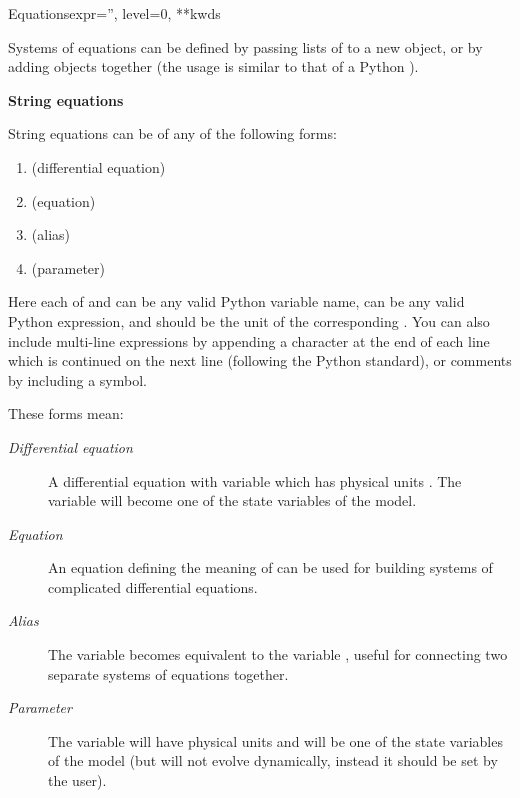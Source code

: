 \documentclass[letterpaper,10pt,english]{manual}
\begin{document}
\begin{classdesc}{Equations}{expr='', level=0, **kwds}
\begin{description}
\end{description}

Systems of equations can be defined by passing lists of \hyperlink{brian.Equations}{} to a
new \hyperlink{brian.Equations}{} object, or by adding \hyperlink{brian.Equations}{} objects together (the usage
is similar to that of a Python ).

\textbf{String equations}

String equations can be of any of the following forms:
\begin{enumerate}
\item {} 
 (differential equation)

\item {} 
 (equation)

\item {} 
 (alias)

\item {} 
 (parameter)

\end{enumerate}

Here each of  and  can be any valid Python variable name,
 can be any valid Python expression, and  should be the
unit of the corresponding . You can also include multi-line
expressions by appending a \code{\textbackslash{}} character at the end of each line
which is continued on the next line (following the Python standard),
or comments by including a \code{\#} symbol.

These forms mean:
\begin{description}
\item[\emph{Differential equation}]
A differential equation with variable  which has physical
units . The variable  will become one of the state
variables of the model.

\item[\emph{Equation}]
An equation defining the meaning of  can be used for building
systems of complicated differential equations.

\item[\emph{Alias}]
The variable  becomes equivalent to the variable , useful
for connecting two separate systems of equations together.

\item[\emph{Parameter}]
The variable  will have physical units  and will be
one of the state variables of the model (but will not evolve
dynamically, instead it should be set by the user).


\end{description}
\end{classdesc}
\end{document}
